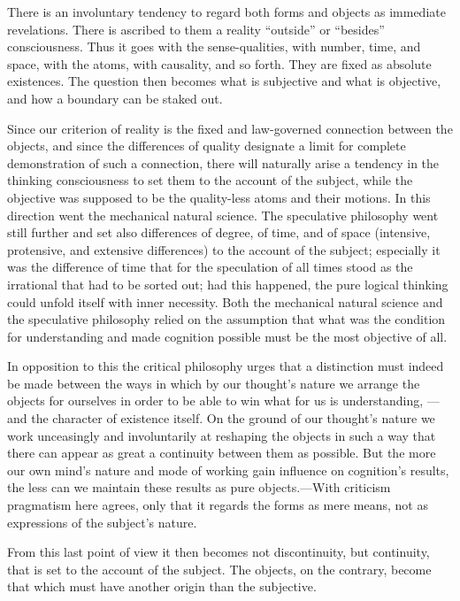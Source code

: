 \documentclass[12pt,a4paper]{book}
\newcommand{\opage}[1]{\marginnote{\footnotesize\textit{[#1]}}}
\begin{document}
There is an involuntary tendency to regard both forms and objects as immediate
revelations. There is ascribed to them a reality ``outside'' or ``besides''
consciousness. Thus it goes with the sense-qualities, with number, time, and space,
with the atoms, with causality, and so forth. They are fixed as absolute existences.
The question then becomes what is subjective and what is objective, and how a boundary
can be staked out.

Since our criterion of reality is the fixed and law-governed connection between the
objects, and since the differences of quality designate a limit for complete
demonstration of such a connection, there will naturally arise a tendency in the
thinking consciousness to set them to the account of the subject, while the objective
was supposed to be the quality-less atoms and their motions. In this direction went
the mechanical natural science. The speculative philosophy went still further and set
also differences of degree, of time, and of space (intensive, protensive, and
extensive differences) to the account of the subject; especially it was the difference of time that for the speculation of all times stood as the irrational that had to
be sorted out; had this happened, the pure logical thinking could unfold itself with
inner necessity. Both the mechanical natural science and the speculative philosophy
relied on the assumption that what was the condition for understanding and made
cognition possible must be the most objective of all.

In opposition to this the critical philosophy urges that a distinction must indeed be
made between the ways in which by our thought's nature we arrange
the objects for ourselves in order to be able to win what for us is understanding,
---and the character of existence itself. On the ground of our thought's nature we work
unceasingly and involuntarily at reshaping the objects in such a way that there can
appear as great a continuity between them as possible. But the more our own mind's
nature and mode of working gain influence on cognition's results, the less can we
maintain these results as \opage{297}pure objects.---With criticism pragmatism here agrees, only
that it regards the forms as mere means, not as expressions of the subject's nature.

From this last point of view it then becomes not discontinuity, but continuity, that is
set to the account of the subject. The objects, on the contrary, become that which must
have another origin than the subjective.
\end{document}
